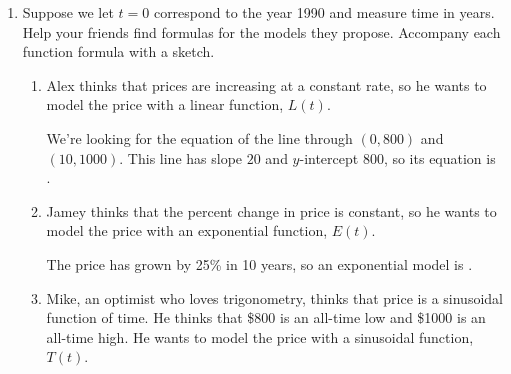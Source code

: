 \documentclass{article}
\begin{document}
\begin{enumerate}
  \begin{enumerate}

  \item Suppose we let $t=0$ correspond to the year 1990 and measure time
    in years. Help your friends find formulas for the models they propose. Accompany each
    function formula with a sketch.
    \probonly{}
      \begin{enumerate}
      \item
        \begin{problem}[\vfill]
          Alex thinks that prices are increasing at a constant rate, so he wants to
    model the price with a linear function, $L(t)$.
        \end{problem}

        \begin{solution}
          We're looking for the equation of the line through $(0, 800)$
          and $(10, 1000)$.  This line has slope $20$ and $y$-intercept
          800, so its equation is .
        \end{solution}

      \item
        \begin{problem}[\vfill]
            Jamey thinks that the percent change in price is constant, so he
    wants to model the price with an exponential function, $E(t)$.
        \end{problem}

        \begin{solution}
          The price has grown by 25\% in 10 years, so an exponential model
          is .
        \end{solution}


      \item
        \begin{problem}[\vfill]
            Mike, an optimist who loves trigonometry, thinks that price is a
    sinusoidal function of time. He thinks that \$800 is an all-time low
    and \$1000 is an all-time high. He wants to model the price with a sinusoidal
    function, $T(t)$.
        \end{problem}


\end{enumerate}
\end{enumerate}
\end{enumerate}
\end{document}
